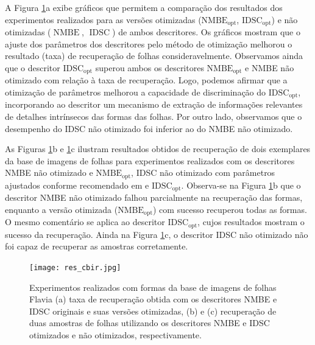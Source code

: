 A Figura \ref{fig1Ooptimization_graph}a exibe gráficos que permitem a comparação dos resultados dos experimentos realizados para as versões otimizadas ($\operatorname{NMBE_{opt}}$, $\operatorname{IDSC_{opt}}$)
 e não otimizadas ($\operatorname{NMBE}$, $\operatorname{IDSC}$) de ambos descritores. Os gráficos mostram que o ajuste dos parâmetros dos descritores pelo método de otimização melhorou o resultado (taxa) de recuperação de folhas consideravelmente. Observamos ainda que o descritor $\operatorname{IDSC_{opt}}$ superou ambos os descritores $\operatorname{NMBE_{opt}}$ e \ac{NMBE} não otimizado com relação à taxa de recuperação. Logo, podemos afirmar que a otimização de parâmetros melhorou a capacidade de discriminação do  $\operatorname{IDSC_{opt}}$, incorporando ao descritor um mecanismo de extração de informações relevantes de detalhes intrínsecos das formas das folhas. Por outro lado, observamos que o desempenho do \ac{IDSC} não otimizado foi inferior ao do \ac{NMBE} não otimizado. 

As Figuras \ref{fig1Ooptimization_graph}b e \ref{fig1Ooptimization_graph}c ilustram resultados obtidos de recuperação de dois exemplares da base de imagens de folhas para experimentos realizados com os descritores \ac{NMBE} não otimizado e $\operatorname{NMBE_{opt}}$,  \ac{IDSC} não otimizado com parâmetros ajustados conforme recomendado em \cite{wang2015march} e $\operatorname{IDSC_{opt}}$. Observa-se na Figura \ref{fig1Ooptimization_graph}b que o descritor \ac{NMBE} não otimizado falhou parcialmente na recuperação das formas, enquanto a versão otimizada ($\operatorname{NMBE_{opt}}$) com sucesso recuperou todas as formas. O mesmo comentário se aplica ao descritor $\operatorname{IDSC_{opt}}$, cujos resultados mostram o sucesso da recuperação. Ainda na Figura \ref{fig1Ooptimization_graph}c, o descritor \ac{IDSC} não otimizado não foi capaz de recuperar as amostras corretamente.

\begin{figure}[]
\caption{Experimentos realizados com formas da base de imagens de folhas Flavia (a) taxa de recuperação  obtida com os descritores \ac{NMBE} e \ac{IDSC} originais e suas versões otimizadas, (b) e (c) recuperação de duas amostras de folhas utilizando os descritores \ac{NMBE} e \ac{IDSC} otimizados e não otimizados, respectivamente.\label{fig1Ooptimization_graph}}
\texttt{[image: res\_cbir.jpg]}
\end{figure}

